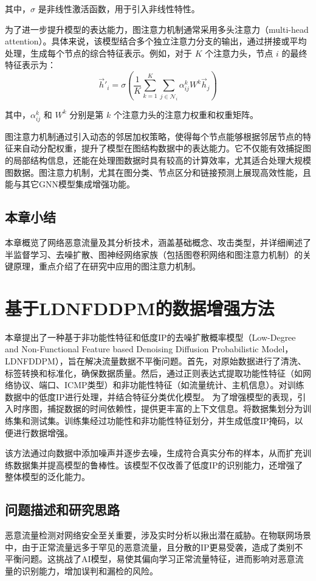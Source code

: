 \documentclass[promaster]{thesis-uestc}
\begin{document}
其中，\( \sigma \) 是非线性激活函数，用于引入非线性特性。

为了进一步提升模型的表达能力，图注意力机制通常采用多头注意力（multi-head attention）。具体来说，该模型结合多个独立注意力分支的输出，通过拼接或平均处理，生成每个节点的综合特征表示。例如，对于 \(K\) 个注意力头，节点 \(i\) 的最终特征表示为：
\begin{equation}
    \vec{h}'_i = \sigma\left( \frac{1}{K} \sum_{k=1}^{K} \sum_{j \in \mathcal{N}_i} \alpha^k_{ij} W^k \vec{h}_j \right)
\end{equation}

其中，\( \alpha^k_{ij} \) 和 \( W^k \) 分别是第 \(k\) 个注意力头的注意力权重和权重矩阵。

图注意力机制通过引入动态的邻居加权策略，使得每个节点能够根据邻居节点的特征来自动分配权重，提升了模型在图结构数据中的表达能力。它不仅能有效捕捉图的局部结构信息，还能在处理图数据时具有较高的计算效率，尤其适合处理大规模图数据。图注意力机制，尤其在图分类、节点区分和链接预测上展现高效性能，且能与其它GNN模型集成增强功能。

\section{本章小结}
本章概览了网络恶意流量及其分析技术，涵盖基础概念、攻击类型，并详细阐述了半监督学习、去噪扩散、图神经网络家族（包括图卷积网络和图注意力机制）的关键原理，重点介绍了在研究中应用的图注意力机制。
\chapter{基于LDNFDDPM的数据增强方法}
本章提出了一种基于非功能性特征和低度IP的去噪扩散概率模型（Low-Degree and Non-Functional Feature based Denoising Diffusion Probabilistic Model，LDNFDDPM），旨在解决流量数据不平衡问题。首先，对原始数据进行了清洗、标签转换和标准化，确保数据质量。然后，通过正则表达式提取功能性特征（如网络协议、端口、ICMP类型）和非功能性特征（如流量统计、主机信息）。对训练数据中的低度IP进行处理，并结合特征分类优化模型。
为了增强模型的表现，引入时序图，捕捉数据的时间依赖性，提供更丰富的上下文信息。将数据集划分为训练集和测试集。训练集经过功能性和非功能性特征划分，并生成低度IP掩码，以便进行数据增强。

该方法通过向数据中添加噪声并逐步去噪，生成符合真实分布的样本，从而扩充训练数据集并提高模型的鲁棒性。该模型不仅改善了低度IP的识别能力，还增强了整体模型的泛化能力。

\section{问题描述和研究思路}
恶意流量检测对网络安全至关重要，涉及实时分析以揪出潜在威胁。在物联网场景中，由于正常流量远多于罕见的恶意流量，且分散的IP更易受袭，造成了类别不平衡问题。这挑战了AI模型，易使其偏向学习正常流量特征，进而影响对恶意流量的识别能力，增加误判和漏检的风险。
\end{document}
